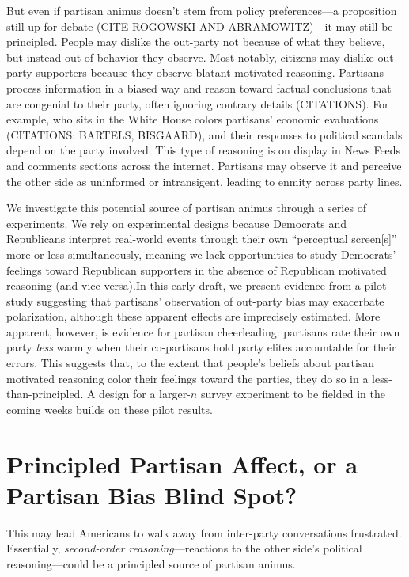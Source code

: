 \documentclass[12pt, letterpaper]{article}
\begin{document}
But even if partisan animus doesn't stem from policy preferences---a proposition still up for debate (CITE ROGOWSKI AND ABRAMOWITZ)---it may still be principled. People may dislike the out-party not because of what they believe, but instead out of behavior they observe. Most notably, citizens may dislike out-party supporters because they observe blatant motivated reasoning. Partisans process information in a biased way and reason toward factual conclusions that are congenial to their party, often ignoring contrary details (CITATIONS). For example, who sits in the White House colors partisans' economic evaluations (CITATIONS: BARTELS, BISGAARD), and their responses to political scandals depend on the party involved. This type of reasoning is on display in News Feeds and comments sections across the internet. Partisans may observe it and perceive the other side as uninformed or intransigent, leading to enmity across party lines.

We investigate this potential source of partisan animus through a series of experiments. We rely on experimental designs because Democrats and Republicans interpret real-world events through their own ``perceptual screen[s]'' \citep{campbell1960} more or less simultaneously, meaning we lack opportunities to study Democrats' feelings toward Republican supporters in the absence of Republican motivated reasoning (and vice versa).In this early draft, we present evidence from a pilot study suggesting that partisans' observation of out-party bias may exacerbate polarization, although these apparent effects are imprecisely estimated. More apparent, however, is evidence for partisan cheerleading: partisans rate their own party \emph{less} warmly when their co-partisans hold party elites accountable for their errors. This suggests that, to the extent that people's beliefs about partisan motivated reasoning color their feelings toward the parties, they do so in a less-than-principled. A design for a larger-$n$ survey experiment to be fielded in the coming weeks builds on these pilot results.

\section*{Principled Partisan Affect, or a Partisan Bias Blind Spot?}

This may lead Americans to walk away from inter-party conversations frustrated. Essentially, \emph{second-order reasoning}---reactions to the other side's political reasoning---could be a principled source of partisan animus. 
\end{document}

